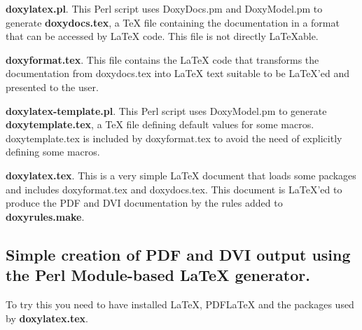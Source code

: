 \begin{DoxyItemize}
\item {\bfseries doxylatex.pl}. This Perl script uses DoxyDocs.pm and DoxyModel.pm to generate {\bfseries doxydocs.tex}, a TeX file containing the documentation in a format that can be accessed by LaTeX code. This file is not directly LaTeXable.


\item {\bfseries doxyformat.tex}. This file contains the LaTeX code that transforms the documentation from doxydocs.tex into LaTeX text suitable to be LaTeX'ed and presented to the user.


\item {\bfseries doxylatex-\/template.pl}. This Perl script uses DoxyModel.pm to generate {\bfseries doxytemplate.tex}, a TeX file defining default values for some macros. doxytemplate.tex is included by doxyformat.tex to avoid the need of explicitly defining some macros.


\item {\bfseries doxylatex.tex}. This is a very simple LaTeX document that loads some packages and includes doxyformat.tex and doxydocs.tex. This document is LaTeX'ed to produce the PDF and DVI documentation by the rules added to {\bfseries doxyrules.make}.


\end{DoxyItemize}\hypertarget{perlmod_pm_pdf_gen}{}\subsection{Simple creation of PDF and DVI output using the Perl Module-\/based LaTeX generator.}\label{perlmod_pm_pdf_gen}
To try this you need to have installed LaTeX, PDFLaTeX and the packages used by {\bfseries doxylatex.tex}.


